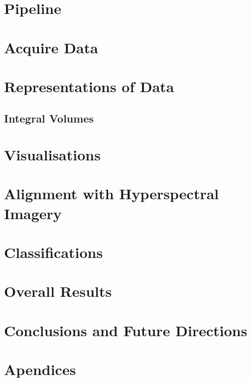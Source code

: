\documentclass{article}
\begin{document}
    \section{Pipeline}\label{Pipeline}
	    
	    \newpage
    \section{Acquire Data}\label{AcquireData}
	    
	    \newpage
    \section{Representations of Data}\label{Representations}
	    
	    \newpage
		 \subsection{Integral Volumes}\label{Rep_IntegralVolumes}
		 	
		 		\newpage
		 		
	\section{Visualisations}\label{Visualisations}
		
		\newpage
	\section{Alignment with Hyperspectral Imagery}\label{Alignment}
		
		\newpage		
	\section{Classifications}\label{Classifications}
		
		\newpage
	\section{Overall Results}\label{Results}
		
		\newpage
	\section{Conclusions and Future Directions}\label{Conclusions}
		
		\newpage

	    
	    {}

		\newpage
	\section{Apendices}\label{Apendices}
	
		
	
    
\end{document}
